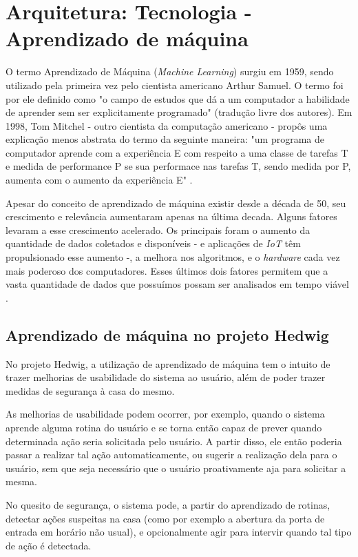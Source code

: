 \chapter{Arquitetura: Tecnologia - Aprendizado de máquina}

	O termo Aprendizado de Máquina (\emph{Machine Learning}) surgiu em 1959, sendo utilizado pela primeira vez  pelo cientista americano Arthur Samuel. O termo foi por ele definido como "o campo de estudos que dá a um computador a habilidade de aprender sem ser explicitamente programado" (tradução livre dos autores). Em 1998, Tom Mitchel - outro cientista da computação americano - propôs uma explicação menos abstrata do termo da seguinte maneira: "um programa de computador aprende com a experiência E com respeito a uma classe de tarefas T e medida de performance P se sua performace nas tarefas T, sendo medida por P, aumenta com o aumento da experiência E" \cite{Coursera}.

	Apesar do conceito de aprendizado de máquina existir desde a década de 50, seu crescimento e relevância aumentaram apenas na última decada. Alguns fatores levaram a esse crescimento acelerado. Os principais foram o aumento da quantidade de dados coletados e disponíveis - e aplicações de \emph{IoT} têm propulsionado esse aumento -, a melhora nos algoritmos, e o \emph{hardware} cada vez mais poderoso dos computadores. Esses últimos dois fatores permitem que a vasta quantidade de dados que possuímos possam ser analisados em tempo viável \cite{hbrMlExplosion}.

	\section{Aprendizado de máquina no projeto Hedwig}

		No projeto Hedwig, a utilização de aprendizado de máquina tem o intuito de trazer melhorias de usabilidade do sistema ao usuário, além de poder trazer medidas de segurança à casa do mesmo.

		As melhorias de usabilidade podem ocorrer, por exemplo, quando o sistema aprende alguma rotina do usuário e se torna então capaz de prever quando determinada ação seria solicitada pelo usuário. A partir disso, ele então poderia passar a realizar tal ação automaticamente, ou sugerir a realização dela para o usuário, sem que seja necessário que o usuário proativamente aja para solicitar a mesma.

		No quesito de segurança, o sistema pode, a partir do aprendizado de rotinas, detectar ações suspeitas na casa (como por exemplo a abertura da porta de entrada em horário não usual), e opcionalmente agir para intervir quando tal tipo de ação é detectada.

